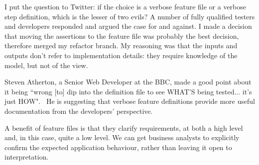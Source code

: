 I put the question to Twitter: if the choice is a verbose feature file or a verbose step definition, which is the lesser of two evils? A number of fully qualified testers and developers responded and argued the case for and against. I made a decision that moving the assertions to the feature file was probably the best decision, therefore merged my refactor branch. My reasoning was that the inputs and outputs don’t refer to implementation details: they require knowledge of the model, but not of the view.

Steven Atherton, a Senior Web Developer at the BBC, made a good point about it being ``wrong [to] dip into the definition file to see WHAT'S being tested... it's just HOW".~\cite{appendix:cucumber:steven} He is suggesting that verbose feature definitions provide more useful documentation from the developers' perspective.

A benefit of feature files is that they clarify requirements, at both a high level and, in this case, quite a low level. We can get business analysts to explicitly confirm the expected application behaviour, rather than leaving it open to interpretation.